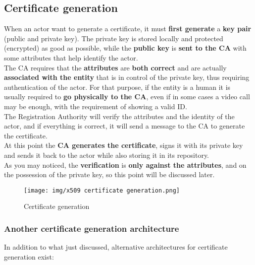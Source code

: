 \subsection{Certificate generation}
When an actor want to generate a certificate, it must \textbf{first
generate} a \textbf{key pair} (public and private key). The private
key is stored locally and protected (encrypted) as good as possible,
while the \textbf{public key} is \textbf{sent to the CA} with some
attributes that help identify the actor.\\
The CA requires that the \textbf{attributes} are \textbf{both correct}
and are actually \textbf{associated with the entity} that is in
control of the private key, thus requiring authentication of the
actor. For that purpose, if the entity is a human it is usually
required to \textbf{go physically to the CA}, even if in some cases a
video call may be enough, with the requirement of showing a valid
ID.\\
The Registration Authority will verify the attributes and the 
identity of the actor, and if everything is correct, it will send a 
message to the CA to generate the certificate.\\
At this point the \textbf{CA generates the certificate}, signs it with
its private key and sends it back to the actor while also storing it
in its repository.\\
As you may noticed, the \textbf{verification} is \textbf{only against
the attributes}, and on the possession of the private key, so this
point will be discussed later.

\begin{figure}[h]
  \centering
  \texttt{[image: img/x509 certificate
  generation.png]}
  \caption{Certificate generation}
\end{figure}

\subsubsection{Another certificate generation architecture}

In addition to what just discussed, alternative architectures for
certificate generation exist:

